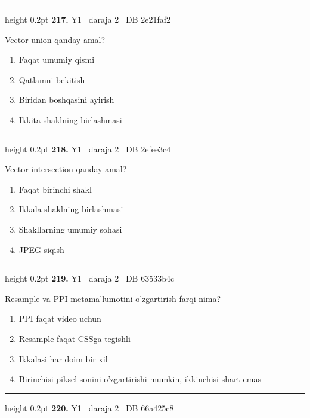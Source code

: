 \documentclass[10pt,a4paper,oneside]{article}
\begin{document}
\vspace{2mm}\hrule height 0.2pt \vspace{4mm}
\hypertarget{q217}{\textbf{\color{ink}217.}}  {\color{muted}\scriptsize Y1 \textbullet\ daraja 2 \textbullet\ DB 2e21faf2}
\par
Vector union qanday amal?
\begin{enumerate}[label=\Alph*),leftmargin=9mm]
\item Faqat umumiy qismi
\item Qatlamni bekitish
\item Biridan boshqasini ayirish
\item Ikkita shaklning birlashmasi
\end{enumerate}
\vspace{2mm}\hrule height 0.2pt \vspace{4mm}
\hypertarget{q218}{\textbf{\color{ink}218.}}  {\color{muted}\scriptsize Y1 \textbullet\ daraja 2 \textbullet\ DB 2efee3c4}
\par
Vector intersection qanday amal?
\begin{enumerate}[label=\Alph*),leftmargin=9mm]
\item Faqat birinchi shakl
\item Ikkala shaklning birlashmasi
\item Shakllarning umumiy sohasi
\item JPEG siqish
\end{enumerate}
\vspace{2mm}\hrule height 0.2pt \vspace{4mm}
\hypertarget{q219}{\textbf{\color{ink}219.}}  {\color{muted}\scriptsize Y1 \textbullet\ daraja 2 \textbullet\ DB 63533b4c}
\par
Resample va PPI metama'lumotini o'zgartirish farqi nima?
\begin{enumerate}[label=\Alph*),leftmargin=9mm]
\item PPI faqat video uchun
\item Resample faqat CSSga tegishli
\item Ikkalasi har doim bir xil
\item Birinchisi piksel sonini o'zgartirishi mumkin, ikkinchisi shart emas
\end{enumerate}
\vspace{2mm}\hrule height 0.2pt \vspace{4mm}
\hypertarget{q220}{\textbf{\color{ink}220.}}  {\color{muted}\scriptsize Y1 \textbullet\ daraja 2 \textbullet\ DB 66a425c8}
\end{document}
